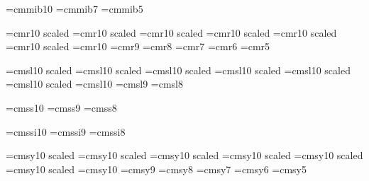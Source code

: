 \font \tenib=cmmib10
\font \sevenib=cmmib7
\font \fiveib=cmmib5

\font \twentyfourrm=cmr10 scaled 
\font \twentyrm=cmr10 scaled 
\font \seventeenrm=cmr10 scaled 
\font \fourteenrm=cmr10 scaled 
\font \twelverm=cmr10 scaled 
\font \elevenrm=cmr10 scaled \magstephalf
\font \tenrm=cmr10
\font \ninerm=cmr9
\font \eightrm=cmr8
\font \sevenrm=cmr7
\font \sixrm=cmr6
\font \fiverm=cmr5

\font \twentyfoursl=cmsl10 scaled 
\font \twentysl=cmsl10 scaled 
\font \seventeensl=cmsl10 scaled 
\font \fourteensl=cmsl10 scaled 
\font \twelvesl=cmsl10 scaled 
\font \elevensl=cmsl10 scaled \magstephalf
\font \tensl=cmsl10
\font \ninesl=cmsl9
\font \eightsl=cmsl8


\font \tenss=cmss10
\font \niness=cmss9
\font \eightss=cmss8



\font \tenssi=cmssi10
\font \ninessi=cmssi9
\font \eightssi=cmssi8

\font \twentyfoursy=cmsy10 scaled 
\font \twentysy=cmsy10 scaled 
\font \seventeensy=cmsy10 scaled 
\font \fourteensy=cmsy10 scaled 
\font \twelvesy=cmsy10 scaled 
\font \elevensy=cmsy10 scaled \magstephalf
\font \tensy=cmsy10
\font \ninesy=cmsy9
\font \eightsy=cmsy8
\font \sevensy=cmsy7
\font \sixsy=cmsy6
\font \fivesy=cmsy5


